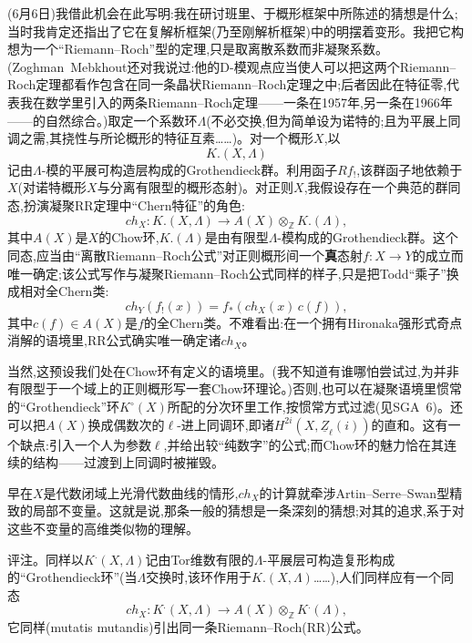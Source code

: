 (6月6日)我借此机会在此写明:我在研讨班里、于概形框架中所陈述的猜想是什么;当时我肯定还指出了它在复解析框架(乃至刚解析框架)中的明摆着变形。我把它构想为一个“Riemann--Roch”型的定理,只是取离散系数而非凝聚系数。(Zoghman~Mebkhout还对我说过:他的D-模观点应当使人可以把这两个Riemann--Roch定理都看作包含在同一条晶状Riemann--Roch定理之中;后者因此在特征零,代表我在数学里引入的两条Riemann--Roch定理——一条在1957年,另一条在1966年——的自然综合。)取定一个系数环$\Lambda$(不必交换,但为简单设为诺特的;且为平展上同调之需,其挠性与所论概形的特征互素……)。对一个概形$X$,以
$$K.(X,\Lambda)$$
记由$\Lambda$-模的平展可构造层构成的Grothendieck群。利用函子$Rf_!$,该群函子地依赖于$X$(对诺特概形$X$与分离有限型的概形态射)。对正则$X$,我假设存在一个典范的群同态,扮演凝聚RR定理中“Chern特征”的角色\dmark{}:
\begin{equation}\tag{15.1}\label{eq:discrete-chern-map}
ch_X: K.(X,\Lambda)\to A(X)\otimes_{\mathbb{Z}} K.(\Lambda),
\end{equation}
其中$A(X)$是$X$的Chow环,$K.(\Lambda)$是由有限型$\Lambda$-模构成的Grothendieck群。这个同态,应当由“离散Riemann--Roch公式”对正则概形间一个\textbf{真}态射$f:X\to Y$的成立而唯一确定;该公式写作与凝聚Riemann--Roch公式同样的样子,只是把Todd“乘子”换成相对全Chern类:
\begin{equation}\tag{15.2}\label{eq:discrete-rr-formula}
ch_Y(f_!(x)) = f_*(ch_X(x)\, c(f)),
\end{equation}
其中$c(f)\in A(X)$是$f$的全Chern类。不难看出:在一个拥有Hironaka强形式奇点消解的语境里,RR公式确实唯一确定诸$ch_X$。

当然,这预设我们处在Chow环有定义的语境里。(我不知道有谁哪怕尝试过,为并非有限型于一个域上的正则概形写一套Chow环理论。)否则,也可以在凝聚语境里惯常的“Grothendieck”环$K^{\circ}(X)$所配的分次环里工作,按惯常方式过滤(见SGA~6)。还可以把$A(X)$换成偶数次的$\ell$-进上同调环,即诸$H^{2i}(X,\underline{Z}_\ell(i))$的直和。这有一个缺点:引入一个人为参数$\ell$,并给出较“纯数字”的公式;而Chow环的魅力恰在其连续的结构——过渡到上同调时被摧毁。

早在$X$是代数闭域上光滑代数曲线的情形,$ch_X$的计算就牵涉Artin--Serre--Swan型精致的局部不变量。这就是说,那条一般的猜想是一条深刻的猜想;对其的追求,系于对这些不变量的高维类似物的理解。

评注。同样以$K^.(X,\Lambda)$记由Tor维数有限的$\Lambda$-平展层可构造复形构成的“Grothendieck环”(当$\Lambda$交换时,该环作用于$K.(X,\Lambda)$……),人们同样应有一个同态
$$ch_X: K^.(X,\Lambda)\to A(X)\otimes_{\mathbb{Z}} K^.(\Lambda),$$
它同样(mutatis mutandis)引出同一条Riemann--Roch(RR)公式。

